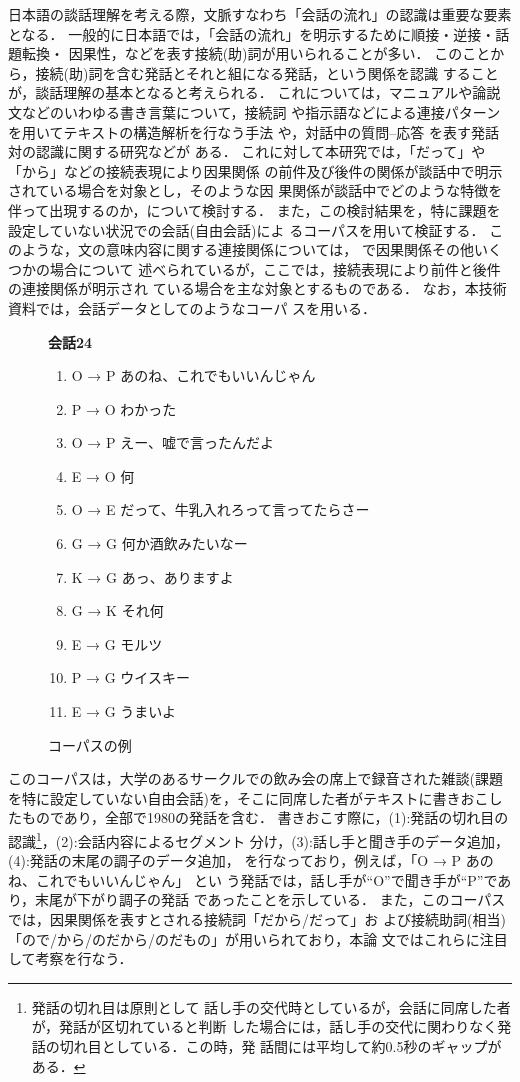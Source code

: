 日本語の談話理解を考える際，文脈すなわち「会話の流れ」の認識は重要な要素
となる．
一般的に日本語では，「会話の流れ」を明示するために順接・逆接・話題転換・
因果性，などを表す接続(助)詞が用いられることが多い．
このことから，接続(助)詞を含む発話とそれと組になる発話，という関係を認識
することが，談話理解の基本となると考えられる．
これについては，マニュアルや論説文などのいわゆる書き言葉について，接続詞
や指示語などによる連接パターンを用いてテキストの構造解析を行なう手法
\cite{福本:文の連接関係解析,田中:文の連接パターン}や，対話中の質問--応答
を表す発話対の認識に関する研究\cite{高野:発話対の認識手法について}などが
ある．
これに対して本研究では，「だって」や「から」などの接続表現により因果関係
の前件及び後件の関係が談話中で明示されている場合を対象とし，そのような因
果関係が談話中でどのような特徴を伴って出現するのか，について検討する．
また，この検討結果を，特に課題を設定していない状況での会話(自由会話)によ
るコーパスを用いて検証する．
このような，文の意味内容に関する連接関係については，
\cite{Hobbs:StructureOfDiscourse}で因果関係その他いくつかの場合について
述べられているが，ここでは，接続表現により前件と後件の連接関係が明示され
ている場合を主な対象とするものである．
なお，本技術資料では，会話データとしてのようなコーパ
スを用いる．
\begin{figure}[htbp]
 {\small
 \setlength{\baselineskip}{2.0mm}
 {\bf 会話24}
 \begin{enumerate} 
  \item O → P あのね、これでもいいんじゃん\da
  \item P → O わかった\da
  \item O → P えー、嘘で言ったんだよ\da
  \item E → O 何\ua
  \item O → E だって、牛乳入れろって言ってたらさー\da
  \item G → G 何か酒飲みたいなー\da
  \item K → G あっ、ありますよ\da
  \item G → K それ何\ua
  \item E → G モルツ\da
  \item P → G ウイスキー\da
  \item E → G うまいよ\da
 \end{enumerate}   
 }
\caption{コーパスの例}
\end{figure}
このコーパスは，大学のあるサークルでの飲み会の席上で録音された雑談(課題
を特に設定していない自由会話)を，そこに同席した者がテキストに書きおこし
たものであり，全部で1980の発話を含む．
書きおこす際に，(1):発話の切れ目の認識\footnote{発話の切れ目は原則として
話し手の交代時としているが，会話に同席した者が，発話が区切れていると判断
した場合には，話し手の交代に関わりなく発話の切れ目としている．この時，発
話間には平均して約0.5秒のギャップがある．}，(2):会話内容によるセグメント
分け，(3):話し手と聞き手のデータ追加，(4):発話の末尾の調子のデータ追加，
を行なっており，例えば，「O → P あのね、これでもいいんじゃん\da 」 \hspace{-.4em}とい
う発話では，話し手が``O''で聞き手が``P''であり，末尾が下がり調子の発話
であったことを示している．
また，このコーパスでは，因果関係を表すとされる接続詞「だから/だって」お
よび接続助詞(相当)「ので/から/のだから/のだもの」が用いられており，本論
文ではこれらに注目して考察を行なう．

